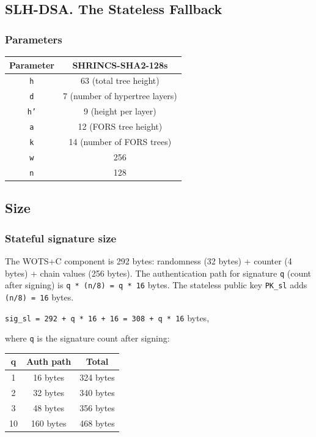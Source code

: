 \subsection{SLH-DSA. The Stateless Fallback}

\subsubsection{Parameters}

\begin{center}
\begin{tabular}{ c c }
 Parameter & SHRINCS-SHA2-128s \\ 
 \hline
 \texttt{h} & 63 (total tree height)\\
 \texttt{d} & 7 (number of hypertree layers) \\
 \texttt{h'} & 9 (height per layer) \\
 \texttt{a} & 12 (FORS tree height) \\
 \texttt{k} & 14 (number of FORS trees) \\
 \texttt{w} & 256 \\
 \texttt{n} & 128 \\
\end{tabular}
\end{center}


\subsection{Size}
\subsubsection{Stateful signature size}

The WOTS+C component is 292 bytes: randomness (32 bytes) + counter (4 bytes) + chain values (256 bytes).
The authentication path for signature \texttt{q} (count after signing) is \texttt{q * (n/8) = q * 16} 
bytes. The stateless public key \texttt{PK\_sl} adds \texttt{(n/8) = 16} bytes.
\begin{center}
    \texttt{sig\_sl = 292 + q * 16 + 16 = 308 + q * 16} bytes,
\end{center}
where \texttt{q} is the signature count after signing:
\begin{center}
\begin{tabular}{ c c c}
    q & Auth path & Total \\
    \hline
    1 & 16 bytes & 324 bytes \\
    2 & 32 bytes & 340 bytes \\
    3 & 48 bytes & 356 bytes \\
    10 & 160 bytes & 468 bytes
\end{tabular}
\end{center}

